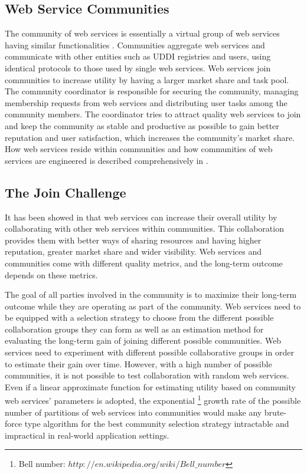 \subsection{Web Service Communities}\label{s:wsc}

The community of web services is essentially a virtual group of web services having similar functionalities \cite{DBLP:journals/ijebr/MaamarSTBB09}. Communities aggregate web services and communicate with other entities such as UDDI registries and users, using identical protocols to those used by single web services. Web services join communities to increase utility by having a larger market share and task pool. The community coordinator is responsible for securing the community, managing membership requests from web services and distributing user tasks among the community members. The coordinator tries to attract quality web services to join and keep the community as stable and productive as possible to gain better reputation and user satisfaction, which increases the community's market share. How web services reside within communities and how communities of web services are engineered is described comprehensively in \cite{DBLP:journals/ijebr/MaamarSTBB09}.

\subsection{The Join Challenge}\label{s:tjc}
It has been showed in \cite{10.1109/ARES.2008.7,10.1109/TSC.2012.12,journal-community-formation} that web services can increase their overall utility by collaborating with other web services within communities. This collaboration provides them with better ways of sharing resources and having higher reputation, greater market share and wider visibility. Web services and communities come with different quality metrics, and the long-term outcome depends on these metrics.

The goal of all parties involved in the community is to maximize their long-term outcome while they are operating as part of the community. Web services need to be equipped with a selection strategy to choose from the different possible collaboration groups they can form as well as an estimation method for evaluating the long-term gain of joining different possible communities. Web services need to experiment with different possible collaborative groups in order to estimate their gain over time. However, with a high number of possible communities, it is not possible to test collaboration with random web services. Even if a linear approximate function for estimating utility based on community web services' parameters is adopted, the exponential \footnote{Bell number: $http://en.wikipedia.org/wiki/Bell\_number$} growth rate of the possible number of partitions of web services into communities would make any brute-force type algorithm for the best community selection strategy intractable and impractical in real-world application settings.

